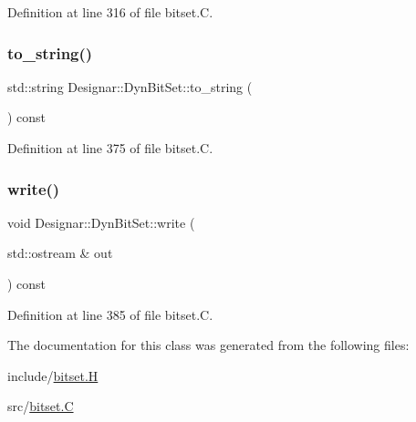 Definition at line 316 of file bitset.\+C.

\mbox{\label{class_designar_1_1_dyn_bit_set_ad393d0c9a7f15f022b0529fbe2983780}} 
\subsubsection{\texorpdfstring{to\+\_\+string()}{to\_string()}}
{\footnotesize\ttfamily std\+::string Designar\+::\+Dyn\+Bit\+Set\+::to\+\_\+string (\begin{DoxyParamCaption}{ }\end{DoxyParamCaption}) const}



Definition at line 375 of file bitset.\+C.

\mbox{\label{class_designar_1_1_dyn_bit_set_ac04df606a53e544d8e87d931be0abac0}} 
\subsubsection{\texorpdfstring{write()}{write()}}
{\footnotesize\ttfamily void Designar\+::\+Dyn\+Bit\+Set\+::write (\begin{DoxyParamCaption}\item[{std\+::ostream \&}]{out }\end{DoxyParamCaption}) const}



Definition at line 385 of file bitset.\+C.



The documentation for this class was generated from the following files\+:\begin{DoxyCompactItemize}
\item 
include/\hyperlink{bitset_8_h}{bitset.\+H}\item 
src/\hyperlink{bitset_8_c}{bitset.\+C}\end{DoxyCompactItemize}
